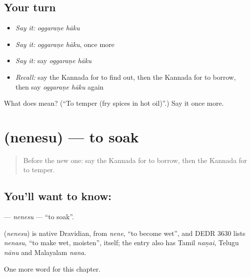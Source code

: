 \subsection*{Your turn}
\begin{itemize}
\raggedright
  \item \emph{Say it:} \emph{oggaraṇe hāku}
  \item \emph{Say it:} \emph{oggaraṇe hāku}, once more
  \item \emph{Say it:} say \emph{oggaraṇe hāku}
  \item \emph{Recall:} say the Kannada for to find out, then the Kannada for to borrow, then say \emph{oggaraṇe hāku} again
\end{itemize}

\begin{tcolorbox}[breakable,colback=teal!4,colframe=teal!35!black,title={Before you move on}]
What does   mean? (\textquotedblleft{}To temper (fry spices in hot oil)\textquotedblright{}.) Say it once more.
\end{tcolorbox}
\section[\texorpdfstring{\kn{ನೆನೆಸು} (nenesu)}{ನೆನೆಸು (nenesu)}]{ (nenesu) — to soak}

\label{lesson:KA-C242-nenesu}



\begin{quote}
Before the new one: say the Kannada for to borrow, then the Kannada for to temper.
\end{quote}

\subsection*{You'll want to know: }
\textbf{} — \emph{nenesu} — \textquotedblleft{}to soak\textquotedblright{}.

\begin{cousinweb}
\textbf{} (\emph{nenesu}) is native Dravidian, from \emph{nene}, \textquotedblleft{}to become wet\textquotedblright{}, and DEDR 3630 lists \emph{nenasu}, \textquotedblleft{}to make wet, moisten\textquotedblright{}, itself; the entry also has Tamil \emph{naṉai}, Telugu \emph{nānu} and Malayalam \emph{nana}.
\end{cousinweb}

\begin{grammarlens}[title={What you've built}]
One more word for this chapter.
\end{grammarlens}

